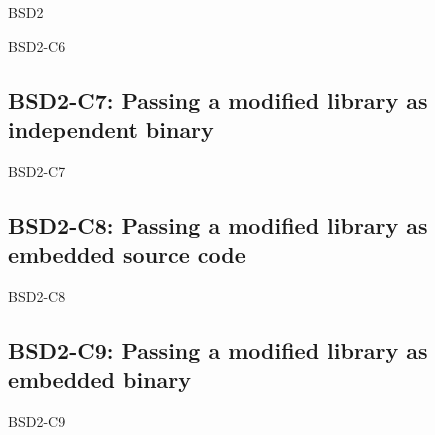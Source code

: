 \begin{license}{BSD2}
\begin{lsuc}{BSD2-C6}
  \lsucmeans{\useCaseSix}
  \lsuccovers{\coversSix}

  \begin{lsucrequires}
    \lsucmandatory{\keepLicenseElements}
  \end{lsucrequires}

  \lsucprohibitsnothing
\end{lsuc}

\subsection{BSD2-C7: Passing a modified library as independent binary}
\begin{lsuc}{BSD2-C7}

  \lsucmeans{\useCaseSeven}
  \lsuccovers{\coversSeven}

  \begin{lsucrequires}
    \lsucmandatory{\insertLicenseIntoBinary}\passingFilesCorrectly
  \end{lsucrequires}

  \lsucprohibitsnothing
\end{lsuc}

\subsection{BSD2-C8: Passing a modified library as embedded source code}
\begin{lsuc}{BSD2-C8}

  \lsucmeans{\useCaseEight}
  \lsuccovers{\coversEight}

  \begin{lsucrequires}
    \lsucmandatory{\keepLicenseElements}
    \lsucoptional{\addLibraryLicenseToCopyrightMessage}
    \lsucoptional{\keepSourcesSeparate}
  \end{lsucrequires}

  \lsucprohibitsnothing
\end{lsuc}

\subsection{BSD2-C9: Passing a modified library as embedded binary}
\begin{lsuc}{BSD2-C9}


\end{lsuc}
\end{license}
